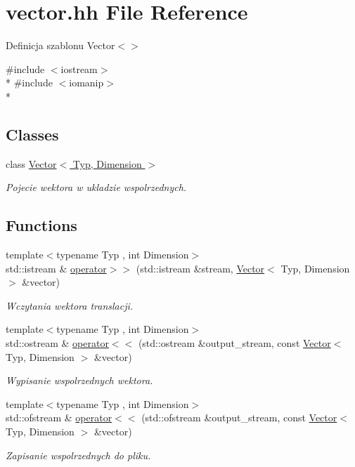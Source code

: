 \hypertarget{vector_8hh}{}\section{vector.\+hh File Reference}
\label{vector_8hh}


Definicja szablonu Vector$<$$>$  


{\ttfamily \#include $<$iostream$>$}\\*
{\ttfamily \#include $<$iomanip$>$}\\*
\subsection*{Classes}
\begin{DoxyCompactItemize}
\item 
class \hyperlink{class_vector}{Vector$<$ Typ, Dimension $>$}
\begin{DoxyCompactList}\small\item\em Pojecie wektora w ukladzie wspolrzednych. \end{DoxyCompactList}\end{DoxyCompactItemize}
\subsection*{Functions}
\begin{DoxyCompactItemize}
\item 
{\footnotesize template$<$typename Typ , int Dimension$>$ }\\std\+::istream \& \hyperlink{vector_8hh_adb28a5f78e62e5f765f75b74becdca71}{operator$>$$>$} (std\+::istream \&stream, \hyperlink{class_vector}{Vector}$<$ Typ, Dimension $>$ \&vector)
\begin{DoxyCompactList}\small\item\em Wczytania wektora translacji. \end{DoxyCompactList}\item 
{\footnotesize template$<$typename Typ , int Dimension$>$ }\\std\+::ostream \& \hyperlink{vector_8hh_afeaf8fb8b664587e991dc4bb914aeb27}{operator$<$$<$} (std\+::ostream \&output\+\_\+stream, const \hyperlink{class_vector}{Vector}$<$ Typ, Dimension $>$ \&vector)
\begin{DoxyCompactList}\small\item\em Wypisanie wspolrzednych wektora. \end{DoxyCompactList}\item 
{\footnotesize template$<$typename Typ , int Dimension$>$ }\\std\+::ofstream \& \hyperlink{vector_8hh_ab463ac1a1b292bf5e677d887482e569b}{operator$<$$<$} (std\+::ofstream \&output\+\_\+stream, const \hyperlink{class_vector}{Vector}$<$ Typ, Dimension $>$ \&vector)
\begin{DoxyCompactList}\small\item\em Zapisanie wspolrzednych do pliku. \end{DoxyCompactList}\end{DoxyCompactItemize}



